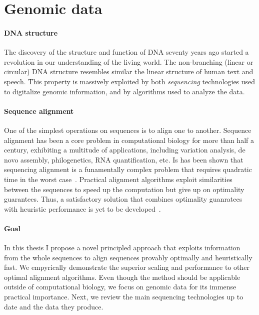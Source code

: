 \section*{Genomic data}

\paragraph{DNA structure} The discovery of the structure and function of
DNA\citep{watson1953structure} seventy years ago started a revolution in our
understanding of the living world. The non-branching (linear or circular) DNA
structure resembles similar the linear structure of human text and speech. This
property is massively exploited by both \emph{sequencing} technologies used to
digitalize genomic information, and by algorithms used to analyze the data.

\paragraph{Sequence alignment} One of the simplest operations on sequences is to
align one to another. Sequence alignment has been a core problem in
computational biology for more than half a century, exhibiting a multitude of
applications, including variation analysis, de novo assembly, philogenetics, RNA
quantification, etc. Is has been shown that sequencing alignment is a
funamentally complex problem that requires quadratic time in the worst
case~\citep{backurs2015edit}. Practical alignment algorithms exploit
similarities between the sequences to speed up the computation but give up on
optimality guarantees. Thus, a satisfactory solution that combines optimality
guanratees with heuristic performance is yet to be
developed~\citep{medvedev2022theoretical}.

\paragraph{Goal} In this thesis I propose a novel principled approach that
exploits information from the whole sequences to align sequences provably
optimally and heuristically fast. We empyrically demonstrate the superior
scaling and performance to other optimal alignment algorithms. Even though the
method should be applicable outside of computational biology, we focus on
genomic data for its immense practical importance. Next, we review the main
sequencing technologies up to date and the data they produce.

